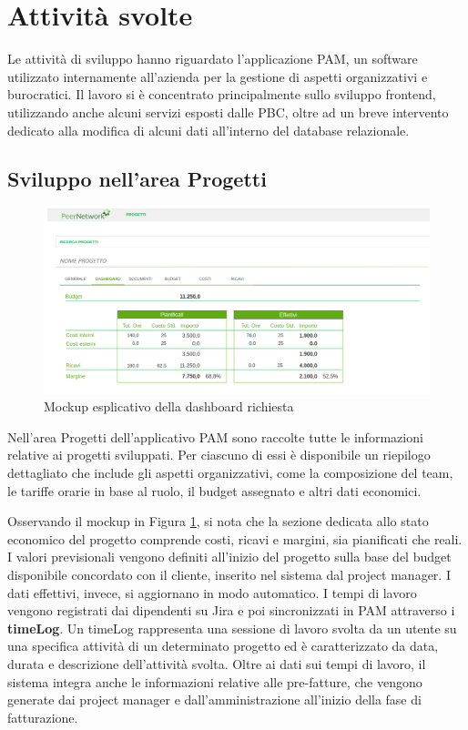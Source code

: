 \section{Attività svolte}
Le attività di sviluppo hanno riguardato l’applicazione \ac{PAM}, un software utilizzato internamente all’azienda
per la gestione di aspetti organizzativi e burocratici. Il lavoro si è concentrato principalmente sullo
sviluppo frontend, utilizzando anche alcuni servizi esposti dalle \ac{PBC}, oltre ad un breve intervento
dedicato alla modifica di alcuni dati all'interno del database relazionale.

    \subsection{Sviluppo nell'area Progetti}
    \begin{figure}
        \centering
        \includegraphics[width=\linewidth]{figures/pam-dashboard.png}
        \caption{Mockup esplicativo della dashboard richiesta}
        \label{fig:mockup-pam}
    \end{figure}

    Nell’area Progetti dell’applicativo \ac{PAM} sono raccolte tutte le informazioni relative
    ai progetti sviluppati. Per ciascuno di essi è disponibile un riepilogo dettagliato che include gli aspetti
    organizzativi, come la composizione del team, le tariffe orarie in base al ruolo, il budget assegnato
    e altri dati economici.

    Osservando il mockup in Figura \ref{fig:mockup-pam}, si nota che la sezione dedicata allo stato economico
    del progetto comprende costi, ricavi e margini, sia pianificati che reali. I valori previsionali
    vengono definiti all’inizio del progetto sulla base del budget disponibile concordato
    con il cliente, inserito nel sistema dal project manager. I dati effettivi, invece, si aggiornano in modo automatico.
    I tempi di lavoro vengono registrati dai dipendenti su Jira e poi sincronizzati in \ac{PAM} attraverso i \textbf{timeLog}.
    Un timeLog rappresenta una sessione di lavoro svolta da un utente su una specifica attività di un determinato progetto ed è caratterizzato da
    data, durata e descrizione dell’attività svolta. Oltre ai dati sui tempi di lavoro, il sistema integra anche le
    informazioni relative alle pre-fatture, che vengono generate dai project manager e dall’amministrazione all’inizio
    della fase di fatturazione.
    
